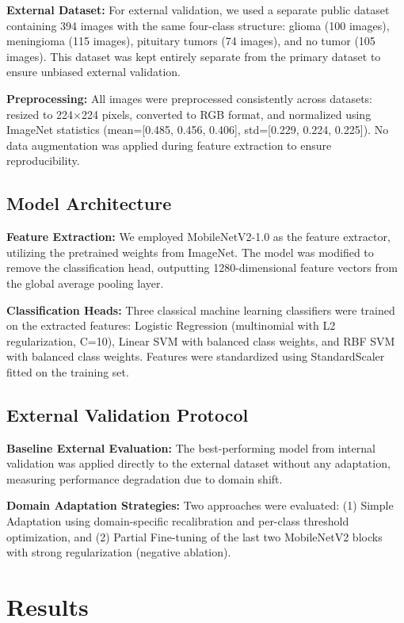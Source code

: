 \documentclass[11pt,a4paper]{article}
\begin{document}
\textbf{External Dataset:} For external validation, we used a separate public dataset containing 394 images with the same four-class structure: glioma (100 images), meningioma (115 images), pituitary tumors (74 images), and no tumor (105 images). This dataset was kept entirely separate from the primary dataset to ensure unbiased external validation.

\textbf{Preprocessing:} All images were preprocessed consistently across datasets: resized to 224×224 pixels, converted to RGB format, and normalized using ImageNet statistics (mean=[0.485, 0.456, 0.406], std=[0.229, 0.224, 0.225]). No data augmentation was applied during feature extraction to ensure reproducibility.

\subsection{Model Architecture}

\textbf{Feature Extraction:} We employed MobileNetV2-1.0 as the feature extractor, utilizing the pretrained weights from ImageNet. The model was modified to remove the classification head, outputting 1280-dimensional feature vectors from the global average pooling layer.

\textbf{Classification Heads:} Three classical machine learning classifiers were trained on the extracted features: Logistic Regression (multinomial with L2 regularization, C=10), Linear SVM with balanced class weights, and RBF SVM with balanced class weights. Features were standardized using StandardScaler fitted on the training set.

\subsection{External Validation Protocol}

\textbf{Baseline External Evaluation:} The best-performing model from internal validation was applied directly to the external dataset without any adaptation, measuring performance degradation due to domain shift.

\textbf{Domain Adaptation Strategies:} Two approaches were evaluated: (1) Simple Adaptation using domain-specific recalibration and per-class threshold optimization, and (2) Partial Fine-tuning of the last two MobileNetV2 blocks with strong regularization (negative ablation).

\section{Results}
\end{document}
